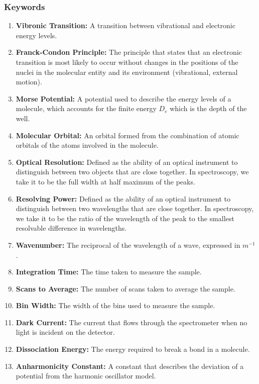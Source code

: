 \documentclass{article}
\begin{document}
\subsubsection{Keywords}
\begin{enumerate}
    \item \textbf{Vibronic Transition:} A transition between vibrational and electronic energy levels.
    
    \item \textbf{Franck-Condon Principle:} The principle that states that an electronic transition is most likely to occur without changes in the positions of the nuclei in the molecular entity and its environment (vibrational, external motion).
    
    \item \textbf{Morse Potential:} A potential used to describe the energy levels of a molecule, which accounts for the finite energy $D_e$ which is the depth of the well.
    
    \item \textbf{Molecular Orbital:} An orbital formed from the combination of atomic orbitals of the atoms involved in the molecule.
    
    \item \textbf{Optical Resolution:} Defined as the ability of an optical instrument to distinguish between two objects that are close together. In spectroscopy, we take it to be the full width at half maximum of the peaks.
    
    \item \textbf{Resolving Power:} Defined as the ability of an optical instrument to distinguish between two wavelengths that are close together. In spectroscopy, we take it to be the ratio of the wavelength of the peak to the smallest resolvable difference in wavelengths.
    
    \item \textbf{Wavenumber:} The reciprocal of the wavelength of a wave, expressed in $m^{-1}$.
    
    \item \textbf{Integration Time:} The time taken to measure the sample.
    
    \item \textbf{Scans to Average:} The number of scans taken to average the sample.
    
    \item \textbf{Bin Width:} The width of the bins used to measure the sample.
    
    \item \textbf{Dark Current:} The current that flows through the spectrometer when no light is incident on the detector.
    
    \item \textbf{Dissociation Energy:} The energy required to break a bond in a molecule.
    
    \item \textbf{Anharmonicity Constant:} A constant that describes the deviation of a potential from the harmonic oscillator model.
    
\end{enumerate}
\end{document}

